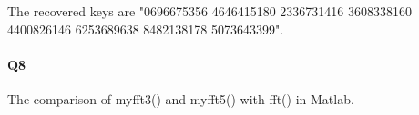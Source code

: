 \documentclass[11pt]{article}
\begin{document}
The recovered keys are "0696675356 4646415180 2336731416 3608338160 4400826146 6253689638 8482138178 5073643399".

\paragraph{Q8}
The comparison of myfft3() and myfft5() with fft() in Matlab.
\begin{figure}[H]
	\centering
\end{figure}
\end{document}
